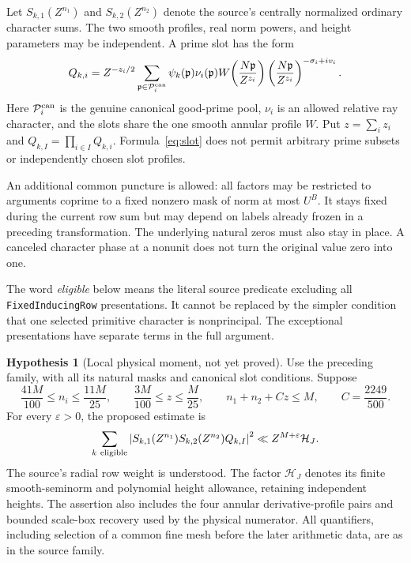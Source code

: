 \documentclass[11pt]{article}
\theoremstyle{definition}
\newtheorem{hypothesis}[proposition]{Hypothesis}
\newcommand{\eps}{\varepsilon}
\newcommand{\code}[1]{\texttt{\small #1}}
\begin{document}
Let $S_{k,1}(Z^{n_1})$ and $S_{k,2}(Z^{n_2})$ denote the source's
centrally normalized ordinary character sums. The two smooth profiles,
real norm powers, and height parameters may be independent. A prime
slot has the form
\begin{equation}\label{eq:slot}
 Q_{k,i}=Z^{-z_i/2}
 \sum_{\mathfrak p\in\mathcal P_i^{\rm can}}
 \psi_k(\mathfrak p)\nu_i(\mathfrak p)
 W\!\left(\frac{N\mathfrak p}{Z^{z_i}}\right)
 \left(\frac{N\mathfrak p}{Z^{z_i}}\right)^{-\sigma_i+iv_i}.
\end{equation}
Here $\mathcal P_i^{\rm can}$ is the genuine canonical good-prime pool,
$\nu_i$ is an allowed relative ray character, and the slots share the
one smooth annular profile $W$. Put $z=\sum_i z_i$ and
$Q_{k,I}=\prod_{i\in I}Q_{k,i}$. Formula~\eqref{eq:slot} does not
permit arbitrary prime subsets or independently chosen slot profiles.

An additional common puncture is allowed: all factors may be restricted
to arguments coprime to a fixed nonzero mask of norm at most $U^B$.
It stays fixed during the current row sum but may depend on labels
already frozen in a preceding transformation. The underlying natural
zeros must also stay in place. A canceled character phase at a nonunit
does not turn the original value zero into one.

The word \emph{eligible} below means the literal source predicate
excluding all \code{FixedInducingRow} presentations. It cannot be
replaced by the simpler condition that one selected primitive character
is nonprincipal. The exceptional presentations have separate terms in
the full argument.

\begin{hypothesis}[Local physical moment, not yet proved]\label{hyp:local}
Use the preceding family, with all its natural masks and canonical slot
conditions. Suppose
\begin{equation}\label{eq:window}
 \frac{41M}{100}\le n_i\le\frac{11M}{25},\qquad
 \frac{3M}{100}\le z\le\frac M{25},\qquad
 n_1+n_2+Cz\le M,\qquad C=\frac{2249}{500}.
\end{equation}
For every $\eps>0$, the proposed estimate is
\begin{equation}\label{eq:moment}
 \sum_{k\ {\rm eligible}}
 \left|S_{k,1}(Z^{n_1})S_{k,2}(Z^{n_2})Q_{k,I}\right|^2
 \ll Z^{M+\eps}\mathcal H_J.
\end{equation}
The source's radial row weight is understood. The factor $\mathcal H_J$
denotes its finite smooth-seminorm and polynomial height allowance,
retaining independent heights. The assertion also includes the four
annular derivative-profile pairs and bounded scale-box recovery used by
the physical numerator. All quantifiers, including selection of a common
fine mesh before the later arithmetic data, are as in the source family.
\end{hypothesis}
\end{document}

